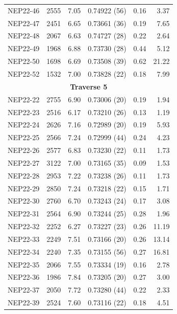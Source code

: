 \begin{landscape}
\begin{minipage}{0.48\linewidth}
\begin{longtable}{l r r l r r}
            NEP22-46 & 2555 & 7.05 & 0.74922 \hfill (56) & 0.16 & 3.37 \\
            NEP22-47 & 2451 & 6.65 & 0.73661 \hfill (36) & 0.19 & 7.65 \\
            NEP22-48 & 2067 & 6.63 & 0.74727 \hfill (28) & 0.22 & 2.64 \\
            NEP22-49 & 1968 & 6.88 & 0.73730 \hfill (28) & 0.44 & 5.12 \\
            NEP22-50 & 1698 & 6.69 & 0.73508 \hfill (39) & 0.62 & 21.22 \\
            NEP22-52 & 1532 & 7.00 & 0.73828 \hfill (22) & 0.18 & 7.99 \\
            \hline
            \multicolumn{6}{c}{\textbf{Traverse 5}} \\

            NEP22-22 & 2755 & 6.90 & 0.73006 \hfill (20) & 0.19 & 1.94 \\
            NEP22-23 & 2516 & 6.17 & 0.73210 \hfill (26) & 0.13 & 1.19 \\
            NEP22-24 & 2626 & 7.16 & 0.72989 \hfill (20) & 0.19 & 5.93 \\
            NEP22-25 & 2566 & 7.24 & 0.72999 \hfill (44) & 0.24 & 4.23 \\
            NEP22-26 & 2577 & 6.83 & 0.73230 \hfill (22) & 0.11 & 1.73 \\
            NEP22-27 & 3122 & 7.00 & 0.73165 \hfill (35) & 0.09 & 1.53 \\
            NEP22-28 & 2953 & 7.22 & 0.73238 \hfill (26) & 0.11 & 1.73 \\
            NEP22-29 & 2850 & 7.24 & 0.73218 \hfill (22) & 0.15 & 1.71 \\
            NEP22-30 & 2760 & 6.70 & 0.73243 \hfill (24) & 0.17 & 3.08 \\
            NEP22-31 & 2564 & 6.90 & 0.73244 \hfill (25) & 0.28 & 1.96 \\
            NEP22-32 & 2252 & 6.27 & 0.73227 \hfill (23) & 0.26 & 11.19 \\
            NEP22-33 & 2249 & 7.51 & 0.73166 \hfill (20) & 0.26 & 13.14 \\
            NEP22-34 & 2240 & 7.35 & 0.73155 \hfill (56) & 0.27 & 16.81 \\
            NEP22-35 & 2066 & 7.55 & 0.73334 \hfill (19) & 0.16 & 2.78 \\
            NEP22-36 & 1986 & 7.84 & 0.73205 \hfill (20) & 0.27 & 3.00 \\
            NEP22-37 & 2050 & 7.72 & 0.73280 \hfill (44) & 0.22 & 2.33 \\
            NEP22-39 & 2524 & 7.60 & 0.73116 \hfill (22) & 0.18 & 4.51 \\

            \hline
        \end{longtable}

    \end{minipage} %

\end{landscape}


